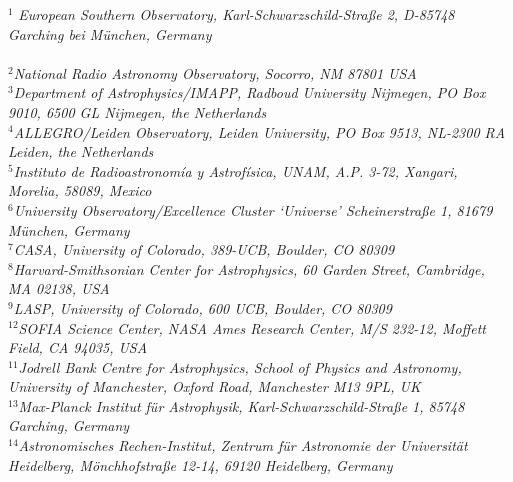 \documentclass[]{article}
\newcommand{\eso}{$^{1}$}
\newcommand{\nrao}{$^{2}$}
\newcommand{\radboud}{$^{3}$}
\newcommand{\allegro}{$^{4}$}
\newcommand{\morelia}{$^{5}$}
\newcommand{\excellence}{$^{6}$}
\newcommand{\casa}{$^{7}$}
\newcommand{\cfa}{$^{8}$}
\newcommand{\lasp}{$^{9}$}
\newcommand{\jodrell}{$^{11}$}
\newcommand{\sofia}{$^{12}$}
\newcommand{\mpia}{$^{13}$}
\newcommand{\iah}{$^{14}$}
\begin{document}
{\eso}{
       \it{
           European Southern Observatory, Karl-Schwarzschild-Stra{\ss}e 2, D-85748 Garching bei München, Germany\\
           }
       } \\ 
{\nrao}{\it{National Radio Astronomy Observatory, Socorro, NM 87801 USA}}\\
{\radboud}{\it{Department of Astrophysics/IMAPP, Radboud University Nijmegen, PO Box 9010, 6500 GL Nijmegen, the Netherlands}} \\
{\allegro}{\it{ALLEGRO/Leiden Observatory, Leiden University, PO Box 9513, NL-2300 RA Leiden, the Netherlands}} \\
{\morelia}{\it{Instituto de Radioastronom{\'i}a y Astrof{\'i}sica, UNAM, A.P. 3-72, Xangari, Morelia, 58089, Mexico}} \\
{\excellence}{\it{University Observatory/Excellence Cluster `Universe' Scheinerstra{\ss}e 1, 81679 M{\"u}nchen, Germany}} \\
{\casa}{\it{CASA, University of Colorado, 389-UCB, Boulder, CO 80309}} \\ 
{\cfa}{\it{Harvard-Smithsonian Center for Astrophysics, 60 Garden
           Street, Cambridge, MA 02138, USA}} \\ 
{\lasp}{\it{LASP, University of Colorado, 600 UCB, Boulder, CO 80309}}\\
{\sofia}{\it{SOFIA Science Center, NASA Ames Research Center, M/S 232-12, Moffett Field, CA 94035, USA}}\\
{\jodrell}{\it{Jodrell Bank Centre for Astrophysics, School of Physics and Astronomy, University of Manchester, Oxford Road, Manchester M13 9PL, UK}} \\
{\mpia}{\it{Max-Planck Institut f{\"u}r Astrophysik, Karl-Schwarzschild-Stra{\ss}e 1, 85748 Garching, Germany}} \\
{\iah}{\it{Astronomisches Rechen-Institut, Zentrum f{\"u}r Astronomie der Universit{\"a}t Heidelberg, M{\"o}nchhofstra{\ss}e 12-14, 69120 Heidelberg, Germany}}
\end{document}
